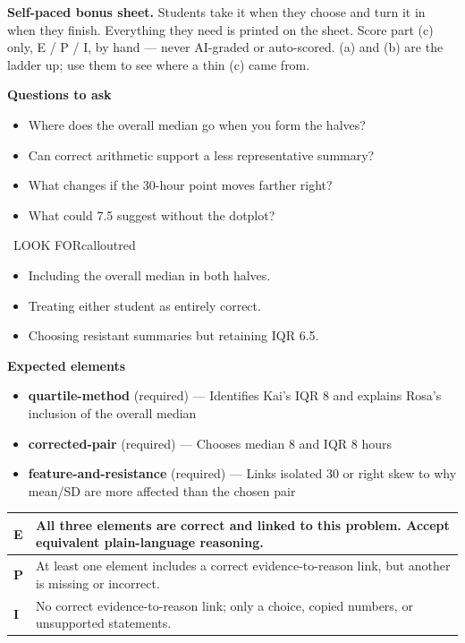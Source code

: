 \documentclass[11pt]{article}
\begin{document}
\textbf{Self-paced bonus sheet.} Students take it when they choose and turn it in when they finish. Everything they need is printed on the sheet. Score part (c) only, E / P / I, by hand --- never AI-graded or auto-scored. (a) and (b) are the ladder up; use them to see where a thin (c) came from.\par

\textbf{Questions to ask}
\begin{itemize}[leftmargin=1.5em,itemsep=2pt,topsep=2pt]
  \item Where does the overall median go when you form the halves?
  \item Can correct arithmetic support a less representative summary?
  \item What changes if the 30-hour point moves farther right?
  \item What could 7.5 suggest without the dotplot?
\end{itemize}

\begin{callout}{\IconWarn\ LOOK FOR}{calloutred}
\begin{itemize}[leftmargin=1.5em,itemsep=2pt,topsep=2pt]
  \item Including the overall median in both halves.
  \item Treating either student as entirely correct.
  \item Choosing resistant summaries but retaining IQR 6.5.
\end{itemize}
\end{callout}


\textbf{Expected elements}
\begin{itemize}[leftmargin=1.5em,itemsep=2pt,topsep=2pt]
  \item \textbf{quartile-method} (required) --- Identifies Kai's IQR 8 and explains Rosa's inclusion of the overall median
  \item \textbf{corrected-pair} (required) --- Chooses median 8 and IQR 8 hours
  \item \textbf{feature-and-resistance} (required) --- Links isolated 30 or right skew to why mean/SD are more affected than the chosen pair
\end{itemize}

{\small\renewcommand{\arraystretch}{1.25}
\noindent\begin{tabular}{|p{0.5in}|p{5.9in}|}
\hline
\textbf{E} & All three elements are correct and linked to this problem. Accept equivalent plain-language reasoning. \\ \hline
\textbf{P} & At least one element includes a correct evidence-to-reason link, but another is missing or incorrect. \\ \hline
\textbf{I} & No correct evidence-to-reason link; only a choice, copied numbers, or unsupported statements. \\ \hline
\end{tabular}}
\end{document}
